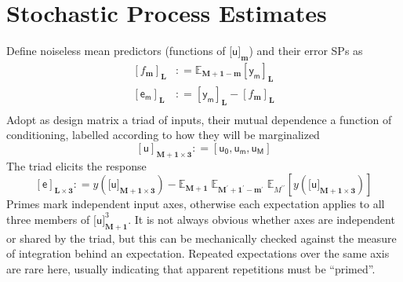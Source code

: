 \documentclass[preprint,12pt]{elsarticle}
\newcommand*{\M}[1]{\ensuremath{#1}\xspace}
\newcommand*{\x}{\times}
\newcommand*{\mi}[1]{\mathbf{#1}}
\newcommand*{\rv}[1]{\mathsf{#1}}
\newcommand*{\te}[2][]{\left\lbrack{#2}\right\rbrack_{#1}}
\newcommand*{\tte}[2][]{\lbrack{#2}\rbrack_{#1}}
\newcommand*{\deq}{\M{\mathrel{\mathop:}=}}
\newcommand*{\ev}[3][]{\mathbb{E}_{#3}^{#1}\!\left\lbrack{#2}\right\rbrack}
\newcommand*{\evt}[3][]{\mathbb{E}_{#3}^{#1}\!#2}
\begin{document}
\section{Stochastic Process Estimates}\label{sec:SPEst}
    Define noiseless mean predictors (functions of $\tte[\mi{m}]{\rv{u}}$) and their error SPs as
    \begin{equation}\label{def:SPEst:fmem}
        \begin{aligned}
            \te[\mi{L}]{f_{\mi{m}}} &\deq \evt{\te[\mi{L}]{\rv{y_m}}}{\mi{M+1-m}} \\
            \te[\mi{L}]{\rv{e_m}} &\deq \te[\mi{L}]{\rv{y_m}} - \te[\mi{L}]{f_{\mi{m}}} \\
        \end{aligned}
    \end{equation}
    Adopt as design matrix a triad of inputs, their mutual dependence a function of conditioning, labelled according to how they will be marginalized
    \begin{equation*}
            \te[\mi{M+1\x 3}]{\rv{u}} \deq \left\lbrack \rv{u_0},\rv{u_m},\rv{u_M} \right\rbrack
    \end{equation*}
    The triad elicits the response
    \begin{equation}\label{def:SPEst:e}
        \te[\mi{L\x 3}]{\rv{e}} \deq y(\tte[\mi{M+1\x 3}]{\rv{u}}) - \evt{\;\evt{\;\ev{y(\tte[\mi{M+1\x 3}]{\rv{u}})}{M^{\prime\prime}}}{\mi{M^{\prime}+1^{\prime}-m^{\prime}}}}{\mi{M+1}}
    \end{equation}
    Primes mark independent input axes, otherwise each expectation applies to all three members of $\tte[\mi{M+1}]{\rv{u}}^3$. It is not always obvious whether axes are independent or shared by the triad, but this can be mechanically checked against the measure of integration behind an expectation. Repeated expectations over the same axis are rare here, usually indicating that apparent repetitions must be ``primed''.
\end{document}
